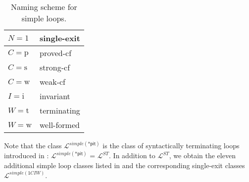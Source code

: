 \begin{table}
    \begin{tabular}{ll}
    $N = 1$   & single-exit  \\ \hline
    $C = \text{p}$ & proved-cf \\
    $C = \text{s}$ & strong-cf \\
    $C = \text{w}$ & weak-cf \\ \hline
    $I = \text{i}$ & invariant \\ \hline
    $W = \text{t}$ & terminating  \\
    $W = \text{w}$ & well-formed  \\
    \end{tabular}
    \caption{Naming scheme for simple loops.}
    \label{tab:simpleloopnames}
\end{table}

Note that the class $\mathcal{L}^{simple(\textsf{*pit})}$ is the class of syntactically terminating loops introduced in : $\mathcal{L}^{simple(\textsf{*pit})}$ = $\mathcal{L}^{ST}$. In addition to $\mathcal{L}^{ST}$, we obtain the eleven additional simple loop classes listed in  and the corresponding single-exit classes $\mathcal{L}^{simple(\textsf{1}CIW)}$.

